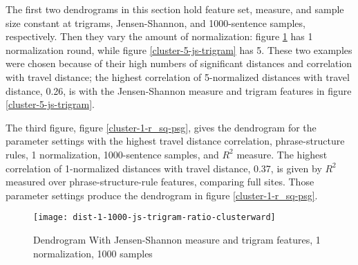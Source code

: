 The first two dendrograms in this section hold feature set, measure,
and sample size constant at trigrams, Jensen-Shannon, and
1000-sentence samples, respectively. Then they vary the amount of
normalization: figure \ref{cluster-1-js-trigram} has 1 normalization
round, while figure \ref{cluster-5-js-trigram} has 5. These two examples
were chosen because of their high numbers of significant
distances and correlation with travel distance; the highest
correlation of 5-normalized distances with travel distance, 0.26, is
with the Jensen-Shannon measure and trigram features in figure
\ref{cluster-5-js-trigram}.

The third figure, figure \ref{cluster-1-r_sq-psg}, gives the dendrogram
for the parameter settings with the highest travel distance
correlation, phrase-structure rules, 1 normalization, 1000-sentence
samples, and $R^2$ measure. The highest correlation of 1-normalized
distances with travel distance, 0.37, is given by $R^2$ measured over
phrase-structure-rule features, comparing full sites. Those parameter
settings produce the dendrogram in figure
\ref{cluster-1-r_sq-psg}.





\begin{figure}
  \texttt{[image: dist-1-1000-js-trigram-ratio-clusterward]}
 \caption{Dendrogram With Jensen-Shannon
    measure and trigram features, 1 normalization, 1000 samples}
  \label{cluster-1-js-trigram}
\end{figure}

